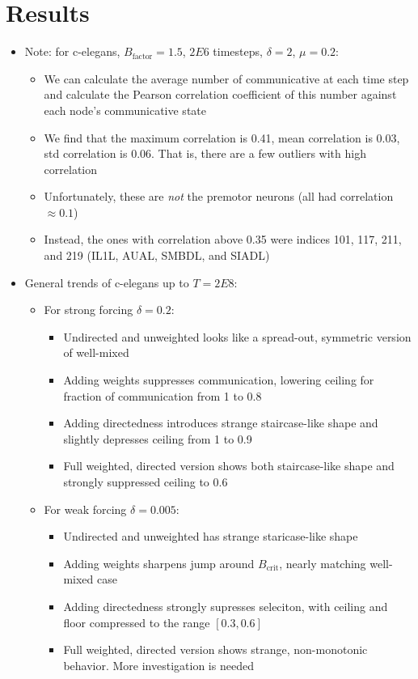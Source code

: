 \documentclass{article}
\begin{document}
\section{Results}
\begin{itemize}
  \item Note: for c-elegans, $B_{\text{factor}} = 1.5$, $2E6$ timesteps,
    $\delta = 2$, $\mu = 0.2$:
  \begin{itemize}
    \item We can calculate the average number of communicative at each
      time step and calculate the Pearson correlation coefficient of
      this number against each node's communicative state
    \item We find that the maximum correlation is \num{0.41}, mean
      correlation is \num{0.03}, std correlation is \num{0.06}. That
      is, there are a few outliers with high correlation
    \item Unfortunately, these are \emph{not} the premotor neurons
      (all had correlation $\approx \num{0.1}$)
    \item Instead, the ones with correlation above \num{0.35} were
      indices 101, 117, 211, and 219 (IL1L, AUAL, SMBDL, and SIADL)
  \end{itemize}
  \item General trends of c-elegans up to $T = 2E8$:
  \begin{itemize}
    \item For strong forcing $\delta = 0.2$:
    \begin{itemize}
      \item Undirected and unweighted looks like a spread-out, symmetric
        version of well-mixed
      \item Adding weights suppresses communication, lowering ceiling
        for fraction of communication from \num{1} to \num{0.8}
      \item Adding directedness introduces strange staircase-like shape
        and slightly depresses ceiling from \num{1} to \num{0.9}
      \item Full weighted, directed version shows both staircase-like
        shape and strongly suppressed ceiling to \num{0.6}
    \end{itemize}
    \item For weak forcing $\delta = 0.005$:
    \begin{itemize}
      \item Undirected and unweighted has strange staricase-like shape
      \item Adding weights sharpens jump around $B_\text{crit}$, nearly
        matching well-mixed case
      \item Adding directedness strongly supresses seleciton, with
        ceiling and floor compressed to the range $[0.3,0.6]$
      \item Full weighted, directed version shows strange, non-monotonic
        behavior. More investigation is needed
    \end{itemize}
  \end{itemize}
\end{itemize}

\printbibliography
\end{document}
